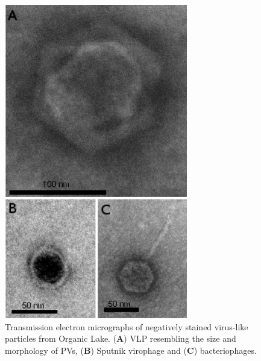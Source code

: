 \begin{figure}
\centering
\includegraphics[width=80mm]{olv_figures/TEM.jpg}
\caption[Transmission electron micrographs of \acp{VLP}]{Transmission electron micrographs of negatively stained virus-like particles from Organic Lake. 
(\textbf{A}) \ac{VLP} resembling the size and morphology of \acp{PV},
(\textbf{B}) Sputnik virophage and (\textbf{C}) bacteriophages.
}
\label{fig:TEM}

\end{figure}

